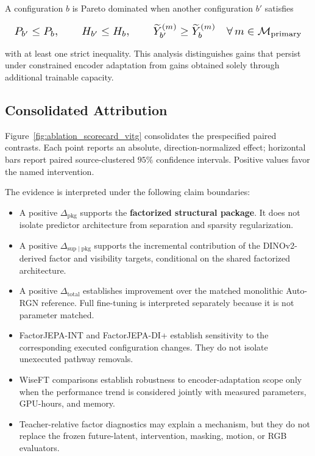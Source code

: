 A configuration \(b\) is Pareto dominated when another configuration
\(b'\) satisfies

\begin{equation*}
\resizebox{0.98\columnwidth}{!}{$\displaystyle
P_{b'}\le P_b,
\qquad
H_{b'}\le H_b,
\qquad
\widetilde Y_{b'}^{(m)}
\ge
\widetilde Y_b^{(m)}
\quad
\forall\,m\in\mathcal M_{\mathrm{primary}}
$}
\end{equation*}

with at least one strict inequality. This analysis distinguishes gains
that persist under constrained encoder adaptation from gains obtained
solely through additional trainable capacity.


\subsection{Consolidated Attribution}
\label{app:attribution_summary}

Figure~\ref{fig:ablation_scorecard_vitg} consolidates the
prespecified paired contrasts. Each point reports an absolute,
direction-normalized effect; horizontal bars report paired
source-clustered \(95\%\) confidence intervals. Positive values favor
the named intervention.



The evidence is interpreted under the following claim boundaries:

\begin{itemize}
    \item A positive \(\Delta_{\mathrm{pkg}}\) supports the
    \textbf{factorized structural package}. It does not isolate
    predictor architecture from separation and sparsity regularization.

    \item A positive
    \(\Delta_{\mathrm{sup}\mid\mathrm{pkg}}\) supports the incremental
    contribution of the DINOv2-derived factor and visibility targets,
    conditional on the shared factorized architecture.

    \item A positive \(\Delta_{\mathrm{total}}\) establishes improvement
    over the matched monolithic Auto-RGN reference. Full fine-tuning is
    interpreted separately because it is not parameter matched.

    \item FactorJEPA-INT and FactorJEPA-DI+ establish sensitivity to the
    corresponding executed configuration changes. They do not isolate
    unexecuted pathway removals.

    \item WiseFT comparisons establish robustness to encoder-adaptation
    scope only when the performance trend is considered jointly with
    measured parameters, GPU-hours, and memory.

    \item Teacher-relative factor diagnostics may explain a mechanism,
    but they do not replace the frozen future-latent, intervention,
    masking, motion, or RGB evaluators.
\end{itemize}

